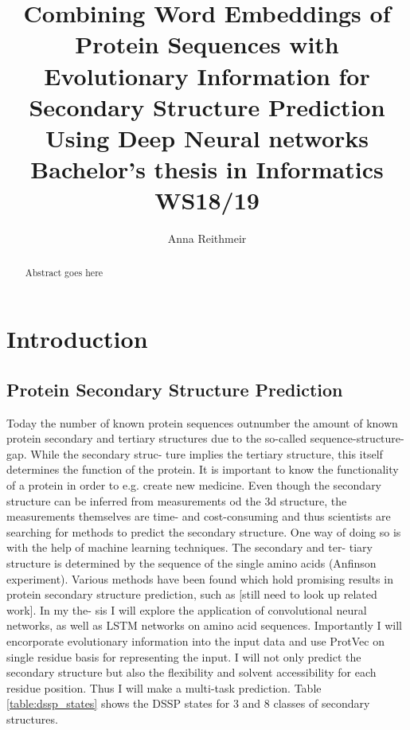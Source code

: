 \documentclass{article}
\title{Combining Word Embeddings of Protein Sequences with Evolutionary Information for Secondary Structure Prediction Using Deep Neural networks \\ Bachelor's thesis in Informatics WS18/19}
\author{Anna Reithmeir}
\begin{document}
\maketitle
\newpage
\tableofcontents
\newpage
\begin{abstract}
Abstract goes here
\end{abstract}
\newpage


\section{Introduction}
\subsection{Protein Secondary Structure Prediction}
Today the number of known protein sequences outnumber the amount of
known protein secondary and tertiary structures due to the so-called sequence-structure-gap. While the secondary struc-
ture implies the tertiary structure, this itself determines the function of the
protein. It is important to know the functionality of a protein in order to e.g.
create new medicine. Even though the secondary structure can be inferred from measurements od the 3d structure, the measurements themselves are time- and cost-consuming and thus scientists are searching for methods
to predict the secondary structure. One way of doing so is with the help of
machine learning techniques. The secondary and ter-
tiary structure is determined by the sequence of the single amino acids (Anfinson experiment). Various
methods have been found which hold promising results in protein secondary
structure prediction, such as [still need to look up related work]. In my the-
sis I will explore the application of convolutional neural networks, as well as
LSTM networks on amino acid sequences. Importantly I will encorporate
evolutionary information into the input data and use ProtVec on single residue
basis for representing the input. I will not only predict the secondary structure
but also the flexibility and solvent accessibility for each residue position. Thus
I will make a multi-task prediction.
Table \ref{table:dssp_states} shows the DSSP states for 3 and 8 classes of secondary structures.
\end{document}
